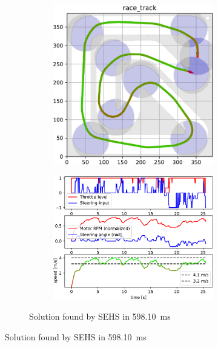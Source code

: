 \begin{figure}[!tbp]
	\vspace{0.75cm}
	
	\begin{subfigure}[t]{\textwidth}
		\begin{subfigure}[c]{0.49\textwidth}
			\includegraphics[width=\textwidth]{../img/experiments/race_track_sehs_trajectory}
		\end{subfigure}
		\hfill
		\begin{subfigure}[c]{0.49\textwidth}
			\includegraphics[width=\textwidth]{../img/experiments/race_track_sehs_actuators}
		\end{subfigure}
		\caption{Solution found by SEHS in \SI{598.10}{\milli\second}}
		\label{fig:race_track-sehs}
	\end{subfigure}
	

\end{figure}
